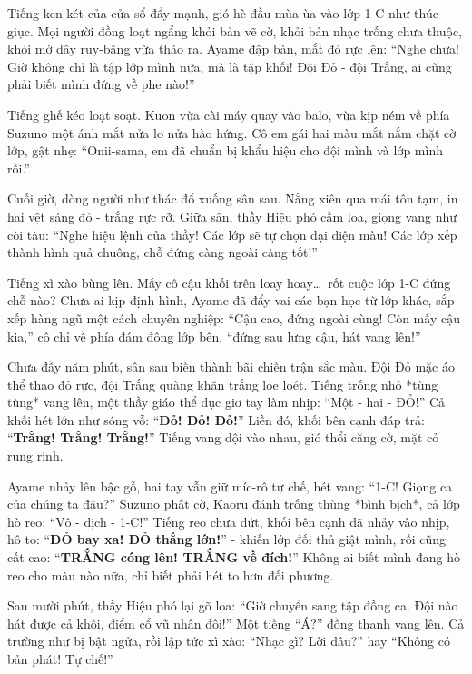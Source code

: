 \documentclass[../main.tex]{subfiles}
\begin{document}
Tiếng ken két của cửa sổ đẩy mạnh, gió hè đầu mùa ùa vào lớp 1-C như thúc giục. Mọi người đồng loạt ngẩng khỏi bản vẽ cờ, khỏi bản nhạc trống chưa thuộc, khỏi mớ dây ruy-băng vừa tháo ra. Ayame đập bàn, mắt đỏ rực lên: ``Nghe chưa! Giờ không chỉ là tập lớp mình nữa, mà là tập khối! Đội Đỏ - đội Trắng, ai cũng phải biết mình đứng về phe nào!''

Tiếng ghế kéo loạt soạt. Kuon vừa cài máy quay vào balo, vừa kịp ném về phía Suzuno một ánh mắt nửa lo nửa hào hứng. Cô em gái hai màu mắt nắm chặt cờ lớp, gật nhẹ: ``Onii-sama, em đã chuẩn bị khẩu hiệu cho đội mình và lớp mình rồi.''

Cuối giờ, dòng người như thác đổ xuống sân sau. Nắng xiên qua mái tôn tạm, in hai vệt sáng đỏ - trắng rực rỡ. Giữa sân, thầy Hiệu phó cầm loa, giọng vang như còi tàu: ``Nghe hiệu lệnh của thầy! Các lớp sẽ tự chọn đại diện màu! Các lớp xếp thành hình quả chuông, chỗ đứng càng ngoài càng tốt!''

Tiếng xì xào bùng lên. Mấy cô cậu khối trên loay hoay\dots\ rốt cuộc lớp 1-C đứng chỗ nào? Chưa ai kịp định hình, Ayame đã đẩy vai các bạn học từ lớp khác, sắp xếp hàng ngũ một cách chuyên nghiệp: ``Cậu cao, đứng ngoài cùng! Còn mấy cậu kia,'' cô chỉ về phía đám đông lớp bên, ``đứng sau lưng cậu, hát vang lên!''

Chưa đầy năm phút, sân sau biến thành bãi chiến trận sắc màu. Đội Đỏ mặc áo thể thao đỏ rực, đội Trắng quàng khăn trắng loe loét. Tiếng trống nhỏ *tùng tùng* vang lên, một thầy giáo thể dục giơ tay làm nhịp: ``Một - hai - ĐỎ!'' Cả khối hét lớn như sóng vỗ: ``\textbf{Đỏ! Đỏ! Đỏ!}'' Liền đó, khối bên cạnh đáp trả: ``\textbf{Trắng! Trắng! Trắng!}'' Tiếng vang dội vào nhau, gió thổi căng cờ, mặt cỏ rung rinh.

Ayame nhảy lên bậc gỗ, hai tay vẫn giữ míc-rô tự chế, hét vang: ``1-C! Giọng ca của chúng ta đâu?'' Suzuno phất cờ, Kaoru đánh trống thùng *bình bịch*, cả lớp hò reo: ``Vô - địch - 1-C!'' Tiếng reo chưa dứt, khối bên cạnh đã nhảy vào nhịp, hô to: ``\textbf{ĐỎ bay xa! ĐỎ thắng lớn!}'' - khiến lớp đối thủ giật mình, rồi cũng cất cao: ``\textbf{TRẮNG cóng lên! TRẮNG về đích!}'' Không ai biết mình đang hò reo cho màu nào nữa, chỉ biết phải hét to hơn đối phương.

Sau mười phút, thầy Hiệu phó lại gõ loa: ``Giờ chuyển sang tập đồng ca. Đội nào hát được cả khối, điểm cổ vũ nhân đôi!'' Một tiếng ``Á?'' đồng thanh vang lên. Cả trường như bị bật ngửa, rồi lập tức xì xào: ``Nhạc gì? Lời đâu?'' hay ``Không có bản phát! Tự chế!''
\end{document}
